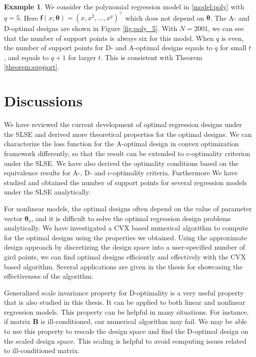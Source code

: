 \documentclass[
]{book}
\theoremstyle{definition}
\theoremstyle{definition}
\newtheorem{example}{Example}[chapter]
\theoremstyle{definition}
\theoremstyle{definition}
\theoremstyle{remark}
\begin{document}
\begin{example}
\protect\hypertarget{exm:polynomial}{}\label{exm:polynomial}We consider the polynomial regression model in \eqref{model:poly} with \(q=5\). Here \(\mathbf{f}(x;\mathbf{\theta}) = (x,x^2,... ,x^q)^\top\) which does not depend on \(\mathbf{\theta}\). The A- and D-optimal designs are shown in Figure \ref{fig:poly_5}. With \(N=2001\), we can see that the number of support points is always six for this model. When \(q\) is even, the number of support points for D- and A-optimal designs equals to \(q\) for small \(t\), and equals to \(q+1\) for larger \(t\). This is consistent with Theorem \ref{theorem:support}.
\end{example}

\chapter{Discussions}\label{chapter:discussions}

We have reviewed the current development of optimal regression designs under the SLSE and derived more theoretical properties for the optimal designs. We can characterize the loss function for the A-optimal design in convex optimization framework differently, so that the result can be extended to c-optimality criterion under the SLSE. We have also derived the optimality conditions based on the equivalence results for A-, D- and c-optimality criteria. Furthermore We have studied and obtained the number of support points for several regression models under the SLSE analytically.

For nonlinear models, the optimal designs often depend on the value of parameter vector \(\boldsymbol{\theta}_o\), and it is difficult to solve the optimal regression design problems analytically. We have investigated a CVX based numerical algorithm to compute for the optimal designs using the properties we obtained. Using the approximate design approach by discretizing the design space into a user-specified number of gird points, we can find optimal designs efficiently and effectively with the CVX based algorithm. Several applications are given in the thesis for showcasing the effectiveness of the algorithm.

Generalized scale invariance property for D-optimality is a very useful property that is also studied in this thesis. It can be applied to both linear and nonlinear regression models. This property can be helpful in many situations. For instance, if matrix \(\boldsymbol{B}\) is ill-conditioned, our numerical algorithm may fail. We may be able to use this property to rescale the design space and find the D-optimal design on the scaled design space. This scaling is helpful to avoid computing issues related to ill-conditioned matrix.
\end{document}
